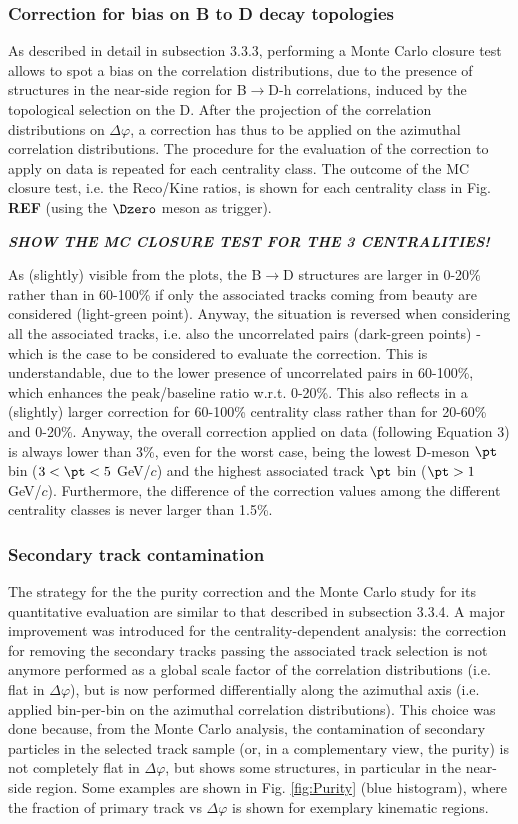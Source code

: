 \subsubsection{Correction for bias on B to D decay topologies}
As described in detail in subsection 3.3.3, performing a Monte Carlo closure test allows to spot a bias on the correlation distributions, due to the presence of structures in the near-side region for B$\rightarrow$D-h correlations, induced by the topological selection on the D.
After the projection of the correlation distributions on $\Delta\varphi$, a correction has thus to be applied on the azimuthal correlation distributions. The procedure for the evaluation of the correction to apply on data is repeated for each centrality class.
The outcome of the MC closure test, i.e. the Reco/Kine ratios, is shown for each centrality class in Fig. {\bf REF} (using the $\Dzero$ meson as trigger).

\textit{\textbf{SHOW THE MC CLOSURE TEST FOR THE 3 CENTRALITIES!}}

As (slightly) visible from the plots, the B$\rightarrow$D structures are larger in 0-20\% rather than in 60-100\% if only the associated tracks coming from beauty are considered (light-green point). Anyway, the situation is reversed when considering all the associated tracks, i.e. also the uncorrelated pairs (dark-green points) - which is the case to be considered to evaluate the correction. This is understandable, due to the lower presence of uncorrelated pairs in 60-100\%, which enhances the peak/baseline ratio w.r.t. 0-20\%. This also reflects in a (slightly) larger correction for 60-100\% centrality class rather than for 20-60\% and 0-20\%.
Anyway, the overall correction applied on data (following Equation 3) is always lower than 3\%, even for the worst case, being the lowest D-meson $\pt$ bin ($3 < \pt < 5$ GeV/$c$) and the highest associated track $\pt$ bin ($\pt > 1$ GeV/$c$).
Furthermore, the difference of the correction values among the different centrality classes is never larger than 1.5\%.

\subsubsection{Secondary track contamination}
The strategy for the the purity correction and the Monte Carlo study for its quantitative evaluation are similar to that described in subsection 3.3.4.
A major improvement was introduced for the centrality-dependent analysis: the correction for removing the secondary tracks passing the associated track selection is not anymore performed as a global scale factor of the correlation distributions (i.e. flat in $\Delta\varphi$), but is now performed differentially along the azimuthal axis (i.e. applied bin-per-bin on the azimuthal correlation distributions).
This choice was done because, from the Monte Carlo analysis, the contamination of secondary particles in the selected track sample (or, in a complementary view, the purity) is not completely flat in $\Delta\varphi$, but shows some structures, in particular in the near-side region. Some examples are shown in Fig. \ref{fig:Purity} (blue histogram), where the fraction of primary track vs $\Delta\varphi$ is shown for exemplary kinematic regions.


